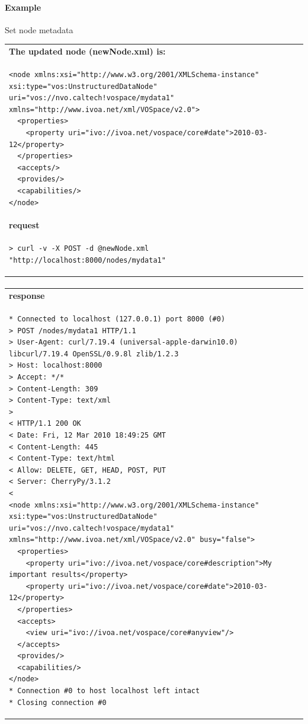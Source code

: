 \documentclass[11pt,a4paper]{ivoa}
\begin{document}
\paragraph{Example}
Set node metadata

\begin{tabular}{ p{10cm} }
\\
\textbf{The updated node (newNode.xml) is:} \\
\begin{lstlisting}
<node xmlns:xsi="http://www.w3.org/2001/XMLSchema-instance"
xsi:type="vos:UnstructuredDataNode"
uri="vos://nvo.caltech!vospace/mydata1"
xmlns="http://www.ivoa.net/xml/VOSpace/v2.0">
  <properties>
    <property uri="ivo://ivoa.net/vospace/core#date">2010-03-12</property>
  </properties>
  <accepts/>
  <provides/>
  <capabilities/>
</node>
\end{lstlisting} \\
\textbf{request} \\
\begin{lstlisting}
> curl -v -X POST -d @newNode.xml "http://localhost:8000/nodes/mydata1"
\end{lstlisting} \\
\end{tabular}
\paragraph{}
\begin{tabular}{ p{10cm} }
\textbf{response} \\
\begin{lstlisting}
* Connected to localhost (127.0.0.1) port 8000 (#0)
> POST /nodes/mydata1 HTTP/1.1
> User-Agent: curl/7.19.4 (universal-apple-darwin10.0) libcurl/7.19.4 OpenSSL/0.9.8l zlib/1.2.3
> Host: localhost:8000
> Accept: */*
> Content-Length: 309
> Content-Type: text/xml
> 
< HTTP/1.1 200 OK
< Date: Fri, 12 Mar 2010 18:49:25 GMT
< Content-Length: 445
< Content-Type: text/html
< Allow: DELETE, GET, HEAD, POST, PUT
< Server: CherryPy/3.1.2
< 
<node xmlns:xsi="http://www.w3.org/2001/XMLSchema-instance"
xsi:type="vos:UnstructuredDataNode" uri="vos://nvo.caltech!vospace/mydata1"
xmlns="http://www.ivoa.net/xml/VOSpace/v2.0" busy="false">
  <properties>
    <property uri="ivo://ivoa.net/vospace/core#description">My important results</property>
    <property uri="ivo://ivoa.net/vospace/core#date">2010-03-12</property>
  </properties>
  <accepts>
    <view uri="ivo://ivoa.net/vospace/core#anyview"/>
  </accepts>
  <provides/>
  <capabilities/>
</node>
* Connection #0 to host localhost left intact
* Closing connection #0
\end{lstlisting}
\end{tabular}
\end{document}
